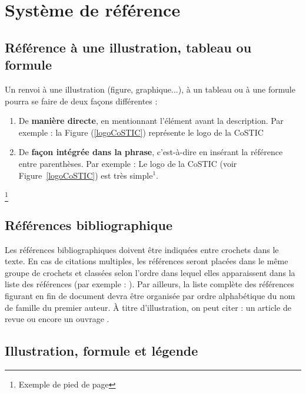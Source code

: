 \documentclass{costic}
\begin{document}
	
	\section{Système de référence}
	
	\subsection{Référence à une illustration, tableau ou formule}
	
	Un renvoi à une illustration (figure, graphique...), à un tableau ou à une formule pourra se faire de deux façons différentes : 
	\begin{enumerate}[label=\roman*)]
		\item De \textbf{manière directe}, en mentionnant l’élément avant la description. Par exemple : la Figure (\ref{logoCoSTIC}) représente le logo de la CoSTIC 
		\item 	De \textbf{façon intégrée dans la phrase}, c’est-à-dire en insérant la référence entre parenthèses. Par exemple : Le logo de la CoSTIC (voir Figure~\ref{logoCoSTIC}) est très simple$^{1}$.
	\end{enumerate}
	\footnote{Exemple de pied de page}
	
	\subsection{Références bibliographique}
	
	Les références bibliographiques doivent être indiquées entre crochets dans le texte. En cas de citations multiples, les références seront placées dans le même groupe de crochets et classées selon l’ordre dans lequel elles apparaissent dans la liste des références (par exemple : \cite{kirkpatrick83,toth02}). Par ailleurs, la liste complète des références figurant en fin de document devra être organisée par ordre alphabétique du nom de famille du premier auteur. À titre d’illustration, on peut citer : un article de revue \cite{kirkpatrick83} ou encore un ouvrage \cite{toth02}.
	
	
	
	\subsection{Illustration, formule et légende}
	
\end{document}

